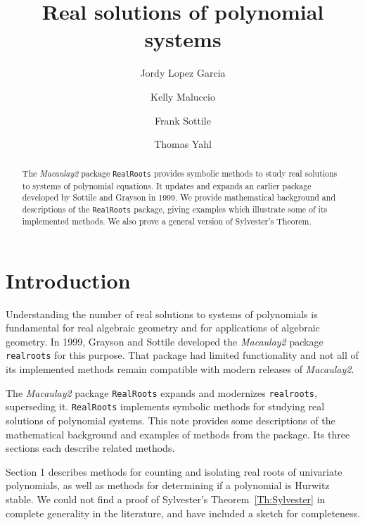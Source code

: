 \documentclass[12pt]{amsart}
\title{Real solutions of polynomial systems}
\author[J.~Lopez Garcia]{Jordy Lopez Garcia}
\author[K.~Maluccio]{Kelly Maluccio}
\author[F.~Sottile]{Frank Sottile}
\author[T.~Yahl]{Thomas Yahl}
\theoremstyle{definition}
\begin{document}
\begin{abstract}
 The \textit{Macaulay2} package \texttt{RealRoots} provides symbolic methods to study real solutions to systems of polynomial equations.
 It updates and expands an earlier package developed by Sottile and Grayson in 1999.
 We provide mathematical background and descriptions of the  \texttt{RealRoots} package, giving examples which illustrate some of its
 implemented methods.
 We also prove a general version of Sylvester's Theorem.
\end{abstract}

\maketitle


\section*{Introduction}


Understanding the number of real solutions to systems of polynomials is fundamental for real algebraic geometry and for applications of
algebraic geometry.
In 1999, Grayson and Sottile \cite{So_M2} developed the \textit{Macaulay2} package \texttt{realroots} for this purpose.
That package had limited functionality and not all of its implemented methods remain compatible with modern releases of \textit{Macaulay2}.

The \textit{Macaulay2} package \texttt{RealRoots} expands and modernizes \texttt{realroots}, superseding it.
\texttt{RealRoots} implements symbolic methods for studying real solutions of polynomial systems.
This note provides some descriptions of the mathematical background and examples of methods from the package.
Its  three sections each describe related methods.

Section 1 describes methods for counting and isolating real roots of univariate polynomials, as well as methods for determining if a
polynomial is Hurwitz stable.
We could not find a proof of Sylvester's Theorem~\ref{Th:Sylvester} in complete generality in the literature, and have included a sketch for
completeness. 
\end{document}
